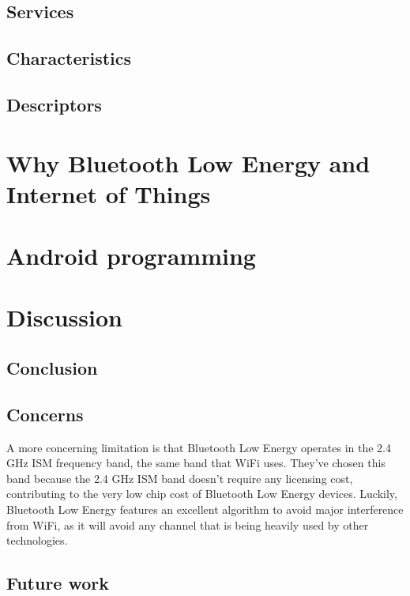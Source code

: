 \documentclass[pdftex,a4paper,12pt,twoside]{report}
\begin{document}
\section{Services}
\label{sec:services}

\section{Characteristics}
\label{sec:characteristics}

\section{Descriptors}
\label{sec:descriptors}

\chapter{Why Bluetooth Low Energy and Internet of Things}
\label{ch:BLEIOT}

\chapter{Android programming}
\label{ch:android}

\chapter{Discussion}
\label{ch:discussion}

\section{Conclusion}
\label{sec:conclusion}

\section{Concerns}
\label{sec:concerns}

A more concerning limitation is that Bluetooth Low Energy operates in the 2.4 GHz ISM frequency band, the same band that WiFi uses. They've chosen this band because the 2.4 GHz ISM band doesn't require any licensing cost, contributing to the very low chip cost of Bluetooth Low Energy devices. Luckily, Bluetooth Low Energy features an excellent algorithm to avoid major interference from WiFi, as it will avoid any channel that is being heavily used by other technologies.


\section{Future work}
\label{sec:futurework}








\listoffigures
\listoftables
\end{document}
